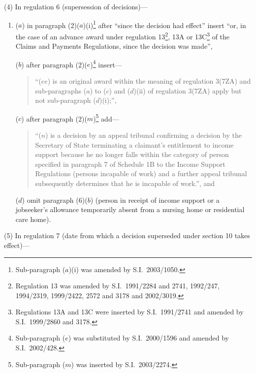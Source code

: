 \documentclass[12pt,a4paper]{article}
\begin{document}
(4) In regulation 6 (supersession of decisions)—
\begin{enumerate}\item[]
($a$) in paragraph (2)($a$)(i)\footnote{Sub-paragraph ($a$)(i) was amended by S.I.\ 2003/1050.} after “since the decision had effect” insert “or, in the case of an advance award under regulation 13\footnote{Regulation 13 was amended by S.I.\ 1991/2284 and 2741, 1992/247, 1994/2319, 1999/2422, 2572 and 3178 and 2002/3019.}, 13A or 13C\footnote{Regulations 13A and 13C were inserted by S.I.\ 1991/2741 and amended by S.I.\ 1999/2860 and 3178.} of the Claims and Payments Regulations, since the decision was made”,

($b$) after paragraph (2)($e$)\footnote{Sub-paragraph ($e$) was substituted by S.I.\ 2000/1596 and amended by S.I.\ 2002/428.} insert—
\begin{quotation}
“($ee$) is an original award within the meaning of regulation 3(7ZA) and sub-paragraphs ($a$)  to ($c$)  and ($d$)(ii)  of regulation 3(7ZA) apply but not sub-paragraph ($d$)(i);”,
\end{quotation}

($c$) after paragraph (2)($m$)\footnote{Sub-paragraph ($m$) was inserted by S.I.\ 2003/2274.} add—
\begin{quotation}
“($n$) is a decision by an appeal tribunal confirming a decision by the Secretary of State terminating a claimant’s entitlement to income support because he no longer falls within the category of person specified in paragraph 7 of Schedule 1B to the Income Support Regulations (persons incapable of work) and a further appeal tribunal subsequently determines that he is incapable of work.”, and
\end{quotation}

($d$) omit paragraph (6)($b$)  (person in receipt of income support or a jobseeker’s allowance temporarily absent from a nursing home or residential care home).
\end{enumerate}

(5) In regulation 7 (date from which a decision superseded under section 10 takes effect)—
\end{document}
